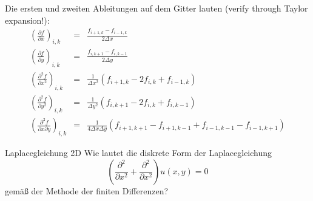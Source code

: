 Die ersten und zweiten Ableitungen auf dem Gitter lauten (verify through Taylor expansion!):
\begin{eqnarray*}
	\left(\frac{\partial f}{\partial x}\right)_{i,k}&=&\frac{f_{i+1,k}-f_{i-1,k}}{2\Delta x}\\
	\left(\frac{\partial f}{\partial y}\right)_{i,k}&=&\frac{f_{i,k+1}-f_{i,k-1}}{2\Delta y}\\
	\left(\frac{\partial^2 f}{\partial x^2}\right)_{i,k}&=&\frac{1}{\Delta
	     x^2}(f_{i+1,k}-2f_{i,k}+f_{i-1,k})\\
	\left(\frac{\partial^2 f}{\partial y^2}\right)_{i,k}&=&\frac{1}{\Delta
	     y^2}(f_{i,k+1}-2f_{i,k}+f_{i,k-1})\\
	\left(\frac{\partial^2 f}{\partial x\partial y}\right)_{i,k}&=&\frac{1}{4\Delta x\Delta
	     y}(f_{i+1,k+1}-f_{i+1,k-1}+f_{i-1,k-1}-f_{i-1,k+1})
\end{eqnarray*}
\begin{example}{Laplacegleichung 2D}
Wie lautet die diskrete Form der Laplacegleichung
\[
\left(
\frac{\partial^2}{\partial x^2}+\frac{\partial^2}{\partial x^2}
\right)u(x,y)=0
\]
gemäß der Methode der finiten Differenzen?
\end{example}